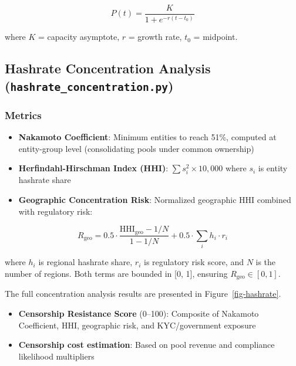 \documentclass[
  11pt,
]{article}
\providecommand{\tightlist}{%
  \setlength{\itemsep}{0pt}\setlength{\parskip}{0pt}}\usepackage{longtable,booktabs,array}
\let\oldsubsection\subsection
\renewcommand{\subsection}[1]{\FloatBarrier\oldsubsection{#1}}
\begin{document}
\[P(t) = \frac{K}{1 + e^{-r(t - t_0)}}\]

where \(K\) = capacity asymptote, \(r\) = growth rate, \(t_0\) =
midpoint.

\hypertarget{hashrate-concentration-analysis-hashrate_concentration.py}{%
\subsection{\texorpdfstring{Hashrate Concentration Analysis
(\texttt{hashrate\_concentration.py})}{Hashrate Concentration Analysis (hashrate\_concentration.py)}}\label{hashrate-concentration-analysis-hashrate_concentration.py}}

\hypertarget{metrics}{%
\subsubsection{Metrics}\label{metrics}}

\begin{itemize}
\tightlist
\item
  \textbf{Nakamoto Coefficient}: Minimum entities to reach 51\%,
  computed at entity-group level (consolidating pools under common
  ownership)
\item
  \textbf{Herfindahl-Hirschman Index (HHI)}:
  \(\sum s_i^2 \times 10{,}000\) where \(s_i\) is entity hashrate share
\item
  \textbf{Geographic Concentration Risk}: Normalized geographic HHI
  combined with regulatory risk:
\end{itemize}

\[R_{\text{geo}} = 0.5 \cdot \frac{\text{HHI}_{\text{geo}} - 1/N}{1 - 1/N} + 0.5 \cdot \sum_i h_i \cdot r_i\]

where \(h_i\) is regional hashrate share, \(r_i\) is regulatory risk
score, and \(N\) is the number of regions. Both terms are bounded in
{[}0, 1{]}, ensuring \(R_{\text{geo}} \in [0, 1]\).

The full concentration analysis results are presented in
Figure~\ref{fig-hashrate}.

\begin{itemize}
\tightlist
\item
  \textbf{Censorship Resistance Score} (0--100): Composite of Nakamoto
  Coefficient, HHI, geographic risk, and KYC/government exposure
\item
  \textbf{Censorship cost estimation}: Based on pool revenue and
  compliance likelihood multipliers
\end{itemize}
\end{document}
